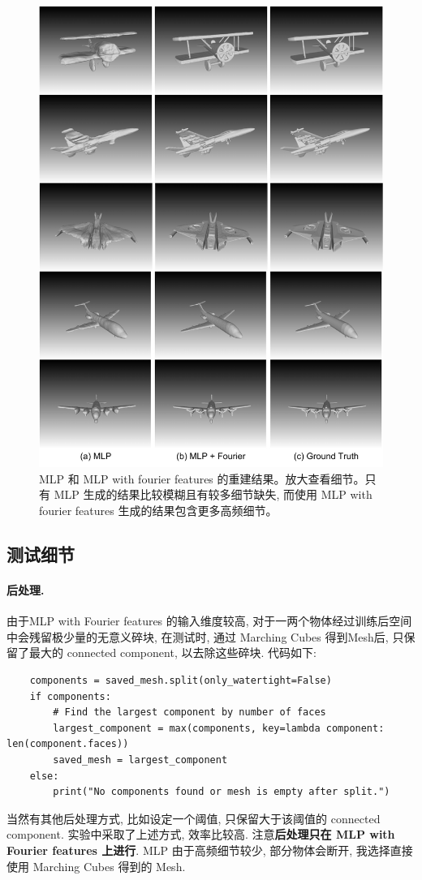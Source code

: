 \documentclass[11pt]{article}
\newcommand\1{\mathds{1}}
\begin{document}
\begin{figure}[htbp]
    \centering
    \includegraphics[width=\textwidth]{imgs/result.pdf}
    \caption{MLP 和 MLP with fourier features 的重建结果。放大查看细节。只有 MLP 生成的结果比较模糊且有较多细节缺失, 而使用 MLP with fourier features 生成的结果包含更多高频细节。}
    \label{fig:result}
\end{figure}

\subsection{测试细节}
\paragraph{后处理.} 由于MLP with Fourier features 的输入维度较高, 对于一两个物体经过训练后空间中会残留极少量的无意义碎块, 
在测试时, 通过 Marching Cubes 得到Mesh后, 只保留了最大的 connected component, 以去除这些碎块. 代码如下:
\begin{verbatim}
    components = saved_mesh.split(only_watertight=False)
    if components:
        # Find the largest component by number of faces
        largest_component = max(components, key=lambda component: len(component.faces))
        saved_mesh = largest_component
    else:
        print("No components found or mesh is empty after split.")
\end{verbatim}
当然有其他后处理方式, 比如设定一个阈值, 只保留大于该阈值的 connected component. 实验中采取了上述方式, 效率比较高. 
注意\textbf{后处理只在 MLP with Fourier features 上进行}. MLP 由于高频细节较少, 部分物体会断开, 我选择直接使用 Marching Cubes 得到的 Mesh.
\end{document}
